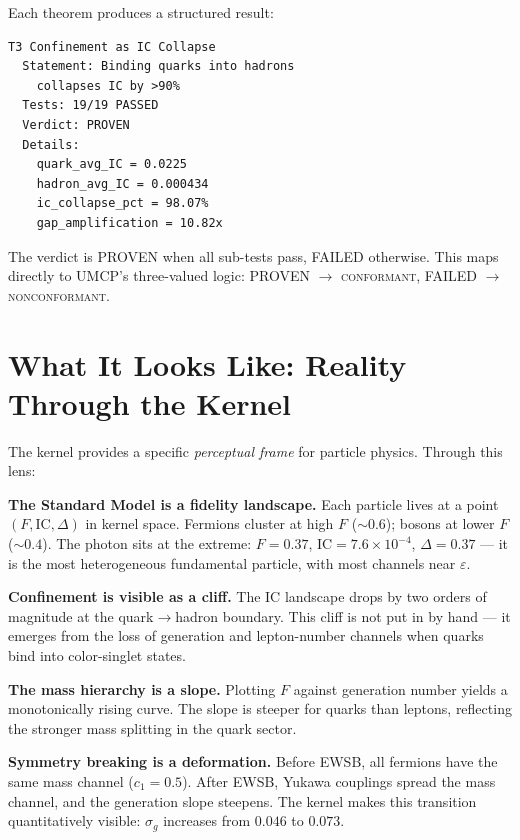 \documentclass[
  aps,
  prd,
  twocolumn,
  superscriptaddress,
  nofootinbib,
  floatfix
]{revtex4-2}
\newcommand{\eps}{\varepsilon}
\newcommand{\regime}[1]{\textrm{\upshape\scshape#1}}
\newcommand{\conform}{\regime{conformant}}
\newcommand{\IC}{\mathrm{IC}}
\begin{document}
Each theorem produces a structured result:

\begin{verbatim}
T3 Confinement as IC Collapse
  Statement: Binding quarks into hadrons
    collapses IC by >90%
  Tests: 19/19 PASSED
  Verdict: PROVEN
  Details:
    quark_avg_IC = 0.0225
    hadron_avg_IC = 0.000434
    ic_collapse_pct = 98.07%
    gap_amplification = 10.82x
\end{verbatim}

The verdict is PROVEN when all sub-tests pass, FAILED otherwise.
This maps directly to UMCP's three-valued logic:
PROVEN $\to$ \conform{}, FAILED $\to$ \regime{nonconformant}.

\section{What It Looks Like: Reality Through the Kernel}
\label{sec:reality}

The kernel provides a specific \emph{perceptual frame} for
particle physics.  Through this lens:

\textbf{The Standard Model is a fidelity landscape.}
Each particle lives at a point $(F, \IC, \Delta)$ in kernel
space.  Fermions cluster at high $F$ ($\sim 0.6$); bosons at
lower $F$ ($\sim 0.4$).  The photon sits at the extreme:
$F = 0.37$, $\IC = 7.6 \times 10^{-4}$, $\Delta = 0.37$ ---
it is the most heterogeneous fundamental particle, with most
channels near $\eps$.

\textbf{Confinement is visible as a cliff.}  The $\IC$ landscape
drops by two orders of magnitude at the quark$\to$hadron
boundary.  This cliff is not put in by hand --- it emerges from
the loss of generation and lepton-number channels when quarks
bind into color-singlet states.

\textbf{The mass hierarchy is a slope.}  Plotting $F$ against
generation number yields a monotonically rising curve.  The
slope is steeper for quarks than leptons, reflecting the
stronger mass splitting in the quark sector.

\textbf{Symmetry breaking is a deformation.}  Before EWSB,
all fermions have the same mass channel ($c_1 = 0.5$).
After EWSB, Yukawa couplings spread the mass channel,
and the generation slope steepens.  The kernel makes this
transition quantitatively visible: $\sigma_g$ increases
from $0.046$ to $0.073$.
\end{document}
